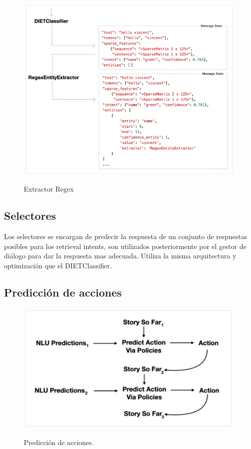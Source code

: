 \begin{figure}[h]
	\centering
	\includegraphics[width=\textwidth]{imagenes/cap3/regex_extractor.png}
	\caption{Extractor Regex}
	\label{fig:regex-extractor}
	\cite{Rasa}
\end{figure}

\subsection{Selectores}
Los selectores se encargan de predecir la respuesta de un conjunto de respuestas posibles para los
retrieval intents, son utilizados posteriormente por el gestor de diálogo para dar la respuesta mas
adecuada.
Utiliza la misma arquitectura y optimización que el DIETClassifier.

\subsection{Predicción de acciones}
\begin{figure}[h!]
	\centering
	\includegraphics[width=\textwidth]{imagenes/cap3/predicciones.png}
	\caption{Predicción de acciones.}
	\label{fig:Predicción de acciones}
	\cite{Rasa}
\end{figure}

